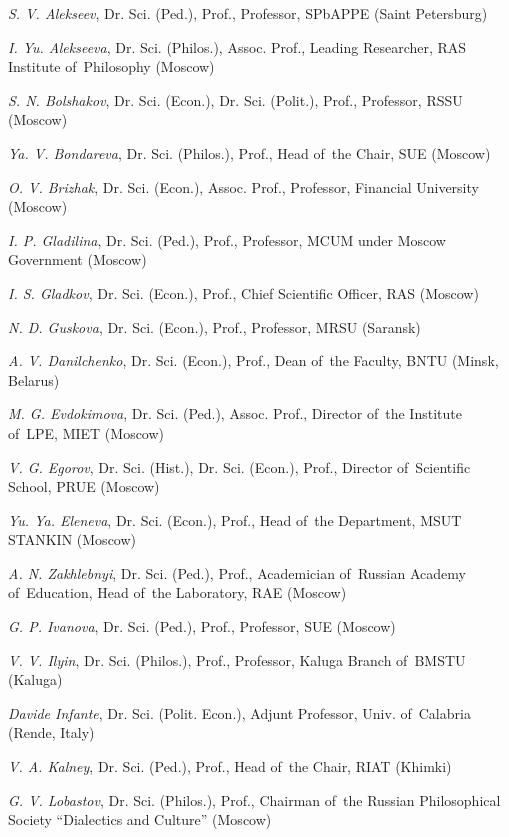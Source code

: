 \begin{otherlanguage}{english}
\begin{multicols}{2}
\begin{flushleft}
\noindent \textit{S. V. Alekseev}, Dr. Sci. (Ped.), Prof., Professor, SPbAPPE (Saint Petersburg)

\noindent \textit{I. Yu. Alekseeva}, Dr. Sci. (Philos.), Assoc. Prof., Leading Researcher, RAS Institute of Philosophy (Moscow)

\noindent \textit{S. N. Bolshakov}, Dr. Sci. (Econ.), Dr. Sci. (Polit.), Prof., Professor, RSSU (Moscow)

\noindent \textit{Ya. V. Bondareva}, Dr. Sci. (Philos.), Prof., Head of the Chair, SUE (Moscow)

\noindent \textit{O. V. Brizhak}, Dr. Sci. (Econ.), Assoc. Prof., Professor, Financial University (Moscow)

\noindent \textit{I. P. Gladilina}, Dr. Sci. (Ped.), Prof., Professor, MCUM under Moscow Government (Moscow)

\noindent \textit{I. S. Gladkov}, Dr. Sci. (Econ.), Prof., Chief Scientific Officer, RAS (Moscow)

\noindent \textit{N. D. Guskova}, Dr. Sci. (Econ.), Prof., Professor, MRSU (Saransk)

\noindent \textit{A. V. Danilchenko}, Dr. Sci. (Econ.), Prof., Dean of the Faculty, BNTU (Minsk, Belarus)

\noindent \textit{M. G. Evdokimova}, Dr. Sci. (Ped.), Assoc. Prof., Director of the Institute of LPE, MIET (Moscow)

\noindent \textit{V. G. Egorov}, Dr. Sci. (Hist.), Dr. Sci. (Econ.), Prof., Director of Scientific School, PRUE (Moscow)

\noindent \textit{Yu. Ya. Eleneva}, Dr. Sci. (Econ.), Prof., Head of the Department, MSUT STANKIN (Moscow)

\noindent \textit{A. N. Zakhlebnyi}, Dr. Sci. (Ped.), Prof., Academician of Russian Academy of Education, Head of the Laboratory, RAE (Moscow)

\noindent \textit{G. P. Ivanova}, Dr. Sci. (Ped.), Prof., Professor, SUE (Moscow)

\noindent \textit{V. V. Ilyin}, Dr. Sci. (Philos.), Prof., Professor, Kaluga Branch of BMSTU (Kaluga)

\noindent \textit{Davide Infante}, Dr. Sci. (Polit. Econ.), Adjunt Professor, Univ. of Calabria (Rende, Italy)

\noindent \textit{V. A. Kalney}, Dr. Sci. (Ped.), Prof., Head of the Chair, RIAT (Khimki)

\noindent \textit{G. V. Lobastov}, Dr. Sci. (Philos.), Prof., Chairman of the Russian Philosophical Society “Dialectics and Culture” (Moscow)


\end{flushleft}
\end{multicols}
\end{otherlanguage}
